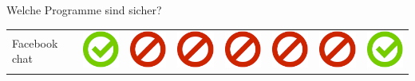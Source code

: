\documentclass[final]{beamer}
\newlength{\twocolwid}
\begin{document}
\begin{frame}[t]
\begin{columns}[t, totalwidth=\textwidth]
\begin{column}{\twocolwid}
\begin{block}{Welche Programme sind sicher?}
\begin{tabular}{ l | C{4cm} | C{4.5cm} | C{4cm} | C{4.5cm} | C{4cm} | C{5cm} | C{3cm} | }
Facebook chat & \includegraphics[scale=0.5]{pics/haken.png} & \includegraphics[scale=0.5]{pics/nohaken.png} & \includegraphics[scale=0.5]{pics/nohaken.png} & \includegraphics[scale=0.5]{pics/nohaken.png} & \includegraphics[scale=0.5]{pics/nohaken.png} & \includegraphics[scale=0.5]{pics/nohaken.png} & \includegraphics[scale=0.5]{pics/haken.png} \tabularnewline

\end{tabular}
\end{block}
\end{column}
\end{columns}
\end{frame}
\end{document}

